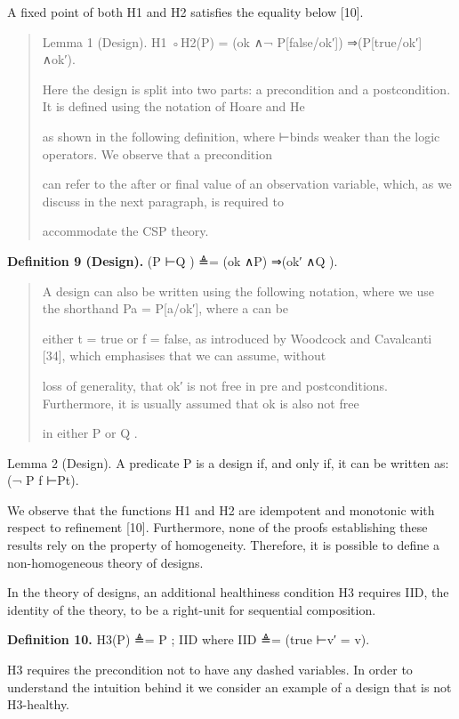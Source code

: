 \documentclass[11pt]{article}
\begin{document}
A fixed point of both H1 and H2 satisfies the equality below [10].

\begin{quote}\small\raggedright
Lemma 1 (Design). H1 ◦H2(P) = (ok ∧¬ P[false/ok′]) ⇒(P[true/ok′] ∧ok′).
\par
Here the design is split into two parts: a precondition and a postcondition. It is defined using the notation of Hoare and He
\par
[10] as shown in the following definition, where ⊢binds weaker than the logic operators. We observe that a precondition
\par
can refer to the after or final value of an observation variable, which, as we discuss in the next paragraph, is required to
\par
accommodate the CSP theory.
\end{quote}

\noindent\textbf{Definition 9 (Design).} (P ⊢Q ) ≜= (ok ∧P) ⇒(ok′ ∧Q ).


\begin{quote}\small\raggedright
A design can also be written using the following notation, where we use the shorthand Pa = P[a/ok′], where a can be
\par
either t = true or f = false, as introduced by Woodcock and Cavalcanti [34], which emphasises that we can assume, without
\par
loss of generality, that ok′ is not free in pre and postconditions. Furthermore, it is usually assumed that ok is also not free
\par
in either P or Q .
\end{quote}

Lemma 2 (Design). A predicate P is a design if, and only if, it can be written as: (¬ P f ⊢Pt).

We observe that the functions H1 and H2 are idempotent and monotonic with respect to refinement [10]. Furthermore, none of the proofs establishing these results rely on the property of homogeneity. Therefore, it is possible to define a non-homogeneous theory of designs.

In the theory of designs, an additional healthiness condition H3 requires IID, the identity of the theory, to be a right-unit for sequential composition.

\noindent\textbf{Definition 10.} H3(P) ≜= P ; IID where IID ≜= (true ⊢v′ = v).


H3 requires the precondition not to have any dashed variables. In order to understand the intuition behind it we consider an example of a design that is not H3-healthy.
\end{document}
